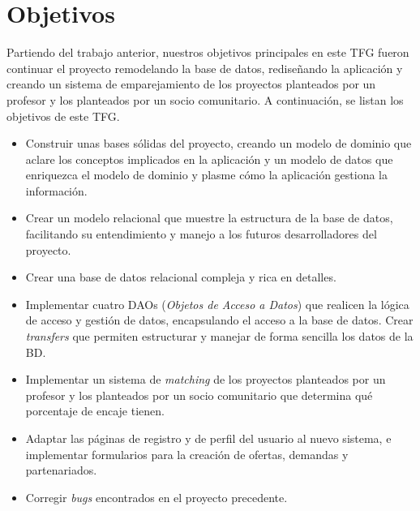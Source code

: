 \documentclass[11pt]{book}
\begin{document}
\section{Objetivos}
Partiendo del trabajo anterior, nuestros objetivos principales en este TFG fueron continuar el proyecto remodelando la base de datos, rediseñando la aplicación y creando un sistema de emparejamiento de los proyectos planteados por un profesor y los planteados por un socio comunitario.
A continuación, se listan los objetivos de este TFG.
\begin{itemize} 
	\item Construir unas bases sólidas del proyecto, creando un modelo de dominio que aclare los conceptos implicados en la aplicación y un modelo de datos que enriquezca el modelo de dominio y plasme cómo la aplicación gestiona la información.
	\item Crear un modelo relacional que muestre la estructura de la base de datos, facilitando su entendimiento y manejo a los futuros desarrolladores del proyecto.
	\item Crear una base de datos relacional compleja y rica en detalles.
	\item Implementar cuatro DAOs (\emph{Objetos de Acceso a Datos}) que realicen la lógica de acceso y gestión de datos, encapsulando el acceso a la base de datos. Crear \textit{transfers} que permiten estructurar y manejar de forma sencilla los datos de la BD.
	\item Implementar un sistema de \textit{matching} de los proyectos planteados por un profesor y los planteados por un socio comunitario que determina qué porcentaje de encaje tienen.
	\item Adaptar las páginas de registro y de perfil del usuario al nuevo sistema, e implementar formularios para la creación de ofertas, demandas y partenariados.
	\item Corregir \textit{bugs} encontrados en el proyecto precedente.
\end{itemize}
\end{document}
